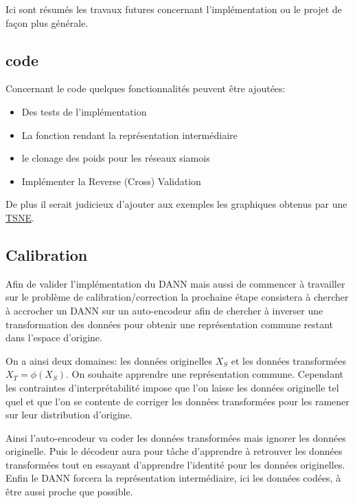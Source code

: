 
Ici sont résumés les travaux futures concernant l'implémentation 
ou le projet de façon plus générale.

\subsection{code} %
\label{sub:code}
Concernant le code quelques fonctionnalités peuvent être ajoutées:
\begin{itemize}
	\item Des tests de l'implémentation
	\item La fonction rendant la représentation intermédiaire
	\item le clonage des poids pour les réseaux siamois
	\item Implémenter la Reverse (Cross) Validation
\end{itemize}

De plus il serait judicieux d'ajouter aux exemples les graphiques obtenus
par une \href{http://scikit-learn.org/stable/modules/generated/sklearn.manifold.TSNE.html}{TSNE}.

\subsection{Calibration} %
\label{sub:calibration}

Afin de valider l'implémentation du DANN mais aussi de commencer à travailler
sur le problème de calibration/correction la prochaine étape consistera à 
chercher à accrocher un DANN sur un auto-encodeur afin de chercher à inverser
une transformation des données pour obtenir une représentation commune restant
dans l'espace d'origine.

On a ainsi deux domaines: 
les données originelles $X_S$ et les données transformées $X_T = \phi(X_S)$.
On souhaite apprendre une représentation commune. Cependant les contraintes 
d'interprétabilité impose que l'on laisse les données originelle tel quel et 
que l'on se contente de corriger les données transformées pour les ramener sur
leur distribution d'origine.

Ainsi l'auto-encodeur va coder les données transformées mais ignorer les données
originelle. Puis le décodeur aura pour tâche d'apprendre à retrouver les données
transformées tout en essayant d'apprendre l'identité pour les données originelles.
Enfin le DANN forcera la représentation intermédiaire, ici les données codées, à
être aussi proche que possible.

